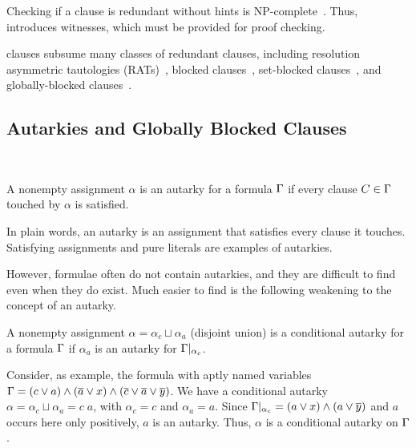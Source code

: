 
Checking if a clause is redundant without hints is NP-complete~\cite{prclause}.
Thus, \pr introduces witnesses, which must be provided for proof checking.

\pr clauses subsume many classes of redundant clauses, including resolution
asymmetric tautologies (RATs)~\cite{rat}, blocked clauses~\cite{blockedclause},
set-blocked clauses~\cite{setblocked}, and globally-blocked
clauses~\cite{conditionalautarkies}.

\subsection{Autarkies and Globally Blocked Clauses}~\label{subsec:autarkies}


\begin{definition}[Autarky]
    A nonempty assignment $\alpha$ is an autarky for a formula $\Gamma$ if
    every clause $C \in \Gamma$ touched by $\alpha$ is satisfied.
\end{definition}


In plain words, an autarky is an assignment that satisfies every clause it touches. Satisfying assignments and pure literals are examples of autarkies.

However, formulae often do not contain autarkies, and they are difficult to find
even when they do exist. Much easier to find is the following weakening to the
concept of an autarky. 

\begin{definition}
    A nonempty assignment $\alpha = \alpha_c \sqcup \alpha_a$ (disjoint union)
    is a conditional autarky for a formula $\Gamma$ if $\alpha_a$ is an
    autarky for $\Gamma|_{\alpha_c}$.
\end{definition}

Consider, as example, the formula with aptly named variables $\Gamma = (c \lor
a) \land (\overline{a} \lor x) \land (\overline{c} \lor \overline{a} \lor
\overline{y})$. We have a conditional autarky $\alpha = \alpha_c \sqcup \alpha_a
= c\;a$, with $\alpha_c = c$ and $\alpha_a = a$. Since $\Gamma|_{\alpha_c} =
(a \lor x) \land (a \lor \overline{y})$ and $a$ occurs here only positively, $a$
is an autarky. Thus, $\alpha$ is a conditional autarky on $\Gamma$.

